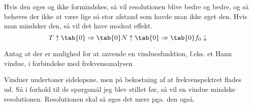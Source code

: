 \begin{rubrik}
\begin{eksamensOpgave}
        \begin{UnderOpgave}
            Hvis den øges og ikke formindskes, så vil resolutionen blive bedre og bedre, og så behøves der ikke at være lige så stor afstand som havde man ikke øget den. 
            Hvis man mindsker den, så vil det have modsat effekt. 
            \[T \uparrow \tab{0} \Rightarrow \tab{0} N \uparrow \tab{0} \Rightarrow \tab{0} f_0\downarrow\]           
        \end{UnderOpgave}
        Antag at der er mulighed for at anvende en vinduesfunktion, f.eks. et Hann vindue, i forbindelse med frekvensanalysen
        \begin{UnderOpgave}
            Vinduer undertoner sidelopsne, men på bekostning af at frekvenspektret flades ud. 
            Så i forhold til de spørgsmål jeg blev stillet før, så vil en vindue mindske resolutionen. Resolutionen skal så øges det mere pga. den også.
        \end{UnderOpgave}
        
    \end{eksamensOpgave}
\end{rubrik}\setcounter{eksamensOpgave}{0}

